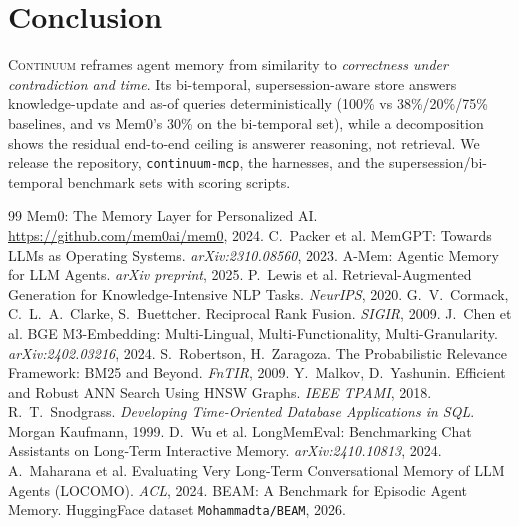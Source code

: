 \documentclass[11pt]{article}
\newcommand{\code}[1]{\texttt{#1}}
\begin{document}
\section{Conclusion}

\textsc{Continuum} reframes agent memory from similarity to \emph{correctness under contradiction
and time}. Its bi-temporal, supersession-aware store answers knowledge-update and as-of queries
deterministically (100\% vs 38\%/20\%/75\% baselines, and vs Mem0's 30\% on the bi-temporal set),
while a decomposition shows the residual end-to-end ceiling is answerer reasoning, not retrieval. We release the repository, \code{continuum-mcp}, the harnesses, and the
supersession/bi-temporal benchmark sets with scoring scripts.

\begin{thebibliography}{99}
\small
{} Mem0: The Memory Layer for Personalized AI. \url{https://github.com/mem0ai/mem0}, 2024.
 C.\ Packer et al. MemGPT: Towards LLMs as Operating Systems. \emph{arXiv:2310.08560}, 2023.
 A-Mem: Agentic Memory for LLM Agents. \emph{arXiv preprint}, 2025.
 P.\ Lewis et al. Retrieval-Augmented Generation for Knowledge-Intensive NLP Tasks. \emph{NeurIPS}, 2020.
 G.\ V.\ Cormack, C.\ L.\ A.\ Clarke, S.\ Buettcher. Reciprocal Rank Fusion. \emph{SIGIR}, 2009.
 J.\ Chen et al. BGE M3-Embedding: Multi-Lingual, Multi-Functionality, Multi-Granularity. \emph{arXiv:2402.03216}, 2024.
 S.\ Robertson, H.\ Zaragoza. The Probabilistic Relevance Framework: BM25 and Beyond. \emph{FnTIR}, 2009.
 Y.\ Malkov, D.\ Yashunin. Efficient and Robust ANN Search Using HNSW Graphs. \emph{IEEE TPAMI}, 2018.
 R.\ T.\ Snodgrass. \emph{Developing Time-Oriented Database Applications in SQL}. Morgan Kaufmann, 1999.
 D.\ Wu et al. LongMemEval: Benchmarking Chat Assistants on Long-Term Interactive Memory. \emph{arXiv:2410.10813}, 2024.
 A.\ Maharana et al. Evaluating Very Long-Term Conversational Memory of LLM Agents (LOCOMO). \emph{ACL}, 2024.
 BEAM: A Benchmark for Episodic Agent Memory. HuggingFace dataset \texttt{Mohammadta/BEAM}, 2026.
\end{thebibliography}
\end{document}

